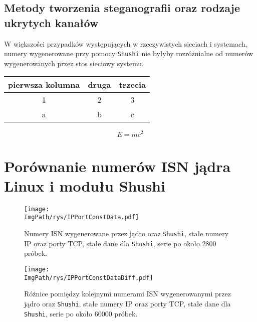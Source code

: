\documentclass[a4paper,12pt,twoside,openany]{report}
\newcommand{\ImgPath}{.}
\newcommand{\tech}{\texttt}
\begin{document}
\section{Metody tworzenia steganografii oraz rodzaje ukrytych kanałów}
 W większości przypadków występujących w rzeczywistych sieciach i 
systemach, numery wygenerowane przy pomocy \tech{Shushi} nie byłyby rozróżnialne 
od numerów wygenerowanych przez stos sieciowy systemu.

\begin{tabular}{c|cc}
pierwsza kolumna & druga & trzecia \\ \hline
1 & 2 & 3 \\
a & b & c \\
\end{tabular} 

\begin{equation}
 E = m c^2 \label{einstein}
\end{equation}



\appendix
\chapter{Porównanie numerów ISN jądra Linux i modułu Shushi}
\begin{figure}[!htbp]
	\begin{center}
\centering
\texttt{[image: \\ImgPath/rys/IPPortConstData.pdf]}
\end{center}
	\caption{Numery ISN wygenerowane przez jądro oraz \tech{Shushi}, stałe 
numery IP oraz porty TCP, stałe dane dla \tech{Shushi}, serie po około 2800 
próbek.}
	\label{IPPortConstData}
\end{figure}

\begin{figure}[!htbp]
	\begin{center}
\centering
\texttt{[image: \\ImgPath/rys/IPPortConstDataDiff.pdf]}
\end{center}
	\caption{Różnice pomiędzy kolejnymi numerami ISN wygenerowanymi przez 
jądro oraz \tech{Shushi}, stałe numery IP oraz porty TCP, stałe dane dla 
\tech{Shushi}, serie po około 60000 próbek.}
	\label{IPPortConstDataDiff}
\end{figure}
\end{document}
